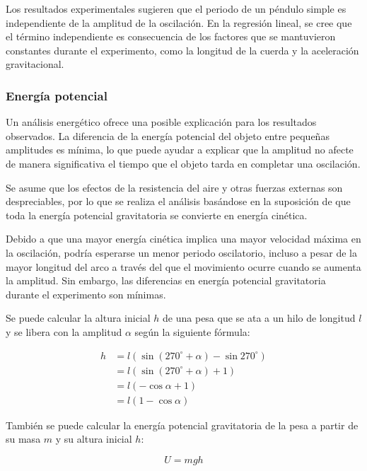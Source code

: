 \documentclass[letterpaper]{report}
\numberwithin{table}{section}
\begin{document}
Los resultados experimentales sugieren que el periodo de un péndulo simple es
independiente de la amplitud de la oscilación. En la regresión lineal, se cree
que el término independiente es consecuencia de los factores que se mantuvieron
constantes durante el experimento, como la longitud de la cuerda y la
aceleración gravitacional.

\subsubsection{Energía potencial}

Un análisis energético ofrece una posible explicación para los resultados
observados. La diferencia de la energía potencial del objeto entre
pequeñas amplitudes es mínima, lo que puede ayudar a explicar que la
amplitud no afecte de manera significativa el tiempo que el objeto
tarda en completar una oscilación.

Se asume que los efectos de la resistencia del aire y otras fuerzas
externas son despreciables, por lo que se realiza el análisis
basándose en la suposición de que toda la energía potencial gravitatoria
se convierte en energía cinética.

Debido a que una mayor energía cinética implica una mayor velocidad
máxima en la oscilación, podría esperarse un menor periodo
oscilatorio, incluso a pesar de la mayor longitud del arco a través
del que el movimiento ocurre cuando se aumenta la amplitud. Sin
embargo, las diferencias en energía potencial gravitatoria durante
el experimento son mínimas.

Se puede calcular la altura inicial $h$ de una pesa que se ata a un hilo de
longitud $l$ y se libera con la amplitud $\alpha$ según la siguiente fórmula:

\begin{align}
  h &= l(\sin{(270^{\circ} + \alpha)} - \sin{270^{\circ}}) \nonumber \\
  &= l(\sin{(270^{\circ} + \alpha)} + 1) \nonumber \\
  &= l(-\cos{\alpha} + 1) \nonumber \\
  &= l(1 - \cos{\alpha})
\end{align}

También se puede calcular la energía potencial gravitatoria de la pesa
a partir de su masa $m$ y su altura inicial $h$:

\begin{equation}
  U = mgh
\end{equation}
\end{document}
